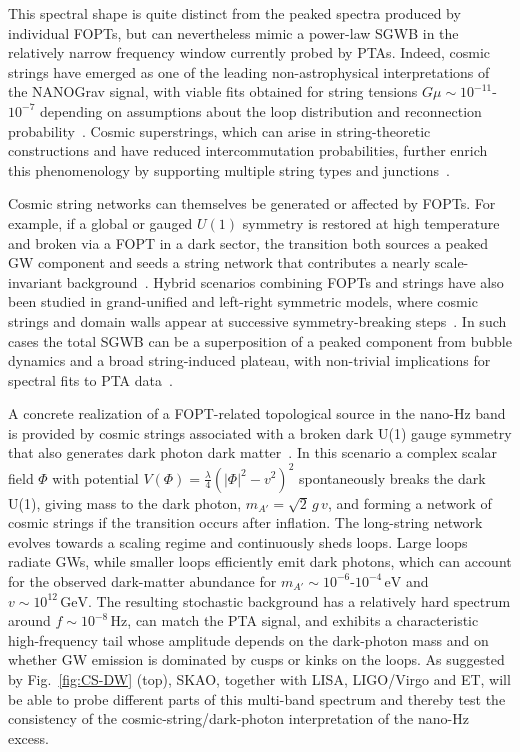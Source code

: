\documentclass[a4paper,11pt]{article}
\begin{document}
This spectral shape is quite distinct from the peaked spectra produced by individual FOPTs, but can nevertheless 
mimic a power-law SGWB in the relatively narrow frequency window currently probed by PTAs. Indeed, cosmic strings 
have emerged as one of the leading non-astrophysical interpretations of the NANOGrav signal, with viable fits obtained 
for string tensions $G\mu \sim 10^{-11}$-$10^{-7}$ depending on assumptions about the loop distribution and reconnection
probability~\citep{Ellis:2020ena,Blasi:2020mfx,Gouttenoire:2019kij,Ellis:2023tsl,Servant:2023UHF,Kitajima:2023cek}. 
Cosmic superstrings, which can arise in string-theoretic constructions and have reduced intercommutation probabilities, 
further enrich this phenomenology by supporting multiple string types and
junctions~\citep{Gouttenoire:2019kij,Ellis:2023tsl}.

Cosmic string networks can themselves be generated or affected by FOPTs. For example, if a global or gauged $U(1)$ symmetry 
is restored at high temperature and broken via a FOPT in a dark sector, the transition both sources a peaked GW component 
and seeds a string network that contributes a nearly scale-invariant
background~\citep{Buchmuller:2023TopDef,Fu:2023GlobalBL}. Hybrid scenarios combining FOPTs and strings 
have also been studied in grand-unified and left-right symmetric models, where cosmic strings and domain walls appear at
successive symmetry-breaking steps~\citep{Dunsky:2022FCOS,Buchmuller:2023TopDef,Tan:2025StringCosmo}. 
In such cases the total SGWB can be a superposition of a peaked component from bubble dynamics and a broad string-induced
plateau, with non-trivial implications for spectral fits to PTA
data~\citep{Borah:2023CSreview,Sousa:2024CSGW}.

A concrete realization of a FOPT-related topological source in the nano-Hz band is provided by cosmic strings associated 
with a broken dark U(1) gauge symmetry that also generates dark photon dark matter~\citep{Kitajima:2023cek}. In this scenario 
a complex scalar field $\Phi$ with potential $V(\Phi) = \frac{\lambda}{4} (|\Phi|^2 - v^2)^2$ spontaneously breaks the dark
U(1), giving mass to the dark photon, $m_{A'} = \sqrt{2}\,g\,v$, and forming a network of cosmic strings if the transition
occurs after inflation. The long-string network evolves towards a scaling regime and continuously sheds loops. Large loops
radiate GWs, while smaller loops efficiently emit dark photons, which can account for the observed dark-matter abundance 
for $m_{A'} \sim 10^{-6}$-$10^{-4}\,\mathrm{eV}$ and $v \sim 10^{12}\,\mathrm{GeV}$. The resulting stochastic background 
has a relatively hard spectrum around $f\sim 10^{-8}\,\mathrm{Hz}$, can match the PTA signal, and exhibits a characteristic 
high-frequency tail whose amplitude depends on the dark-photon mass and on whether GW emission is dominated by cusps 
or kinks on the loops. As suggested by Fig.~\ref{fig:CS-DW} (top), SKAO, together with LISA, LIGO/Virgo and ET, will be able 
to probe different parts of this multi-band spectrum and thereby test the consistency of the cosmic-string/dark-photon
interpretation of the nano-Hz excess.
\end{document}
